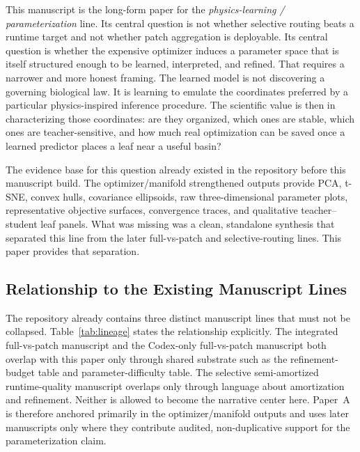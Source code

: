 \documentclass[11pt,a4paper]{article}
\begin{document}
This manuscript is the long-form paper for the \emph{physics-learning / parameterization} line.
Its central question is not whether selective routing beats a runtime target and not whether patch aggregation is deployable.
Its central question is whether the expensive optimizer induces a parameter space that is itself structured enough to be learned, interpreted, and refined.
That requires a narrower and more honest framing.
The learned model is not discovering a governing biological law.
It is learning to emulate the coordinates preferred by a particular physics-inspired inference procedure.
The scientific value is then in characterizing those coordinates: are they organized, which ones are stable, which ones are teacher-sensitive, and how much real optimization can be saved once a learned predictor places a leaf near a useful basin?

The evidence base for this question already existed in the repository before this manuscript build.
The optimizer/manifold strengthened outputs provide PCA, t-SNE, convex hulls, covariance ellipsoids, raw three-dimensional parameter plots, representative objective surfaces, convergence traces, and qualitative teacher--student leaf panels.
What was missing was a clean, standalone synthesis that separated this line from the later full-vs-patch and selective-routing lines.
This paper provides that separation.

\subsection{Relationship to the Existing Manuscript Lines}
The repository already contains three distinct manuscript lines that must not be collapsed.
Table~\ref{tab:lineage} states the relationship explicitly.
The integrated full-vs-patch manuscript and the Codex-only full-vs-patch manuscript both overlap with this paper only through shared substrate such as the refinement-budget table and parameter-difficulty table.
The selective semi-amortized runtime-quality manuscript overlaps only through language about amortization and refinement.
Neither is allowed to become the narrative center here.
Paper~A is therefore anchored primarily in the optimizer/manifold outputs and uses later manuscripts only where they contribute audited, non-duplicative support for the parameterization claim.
\end{document}
